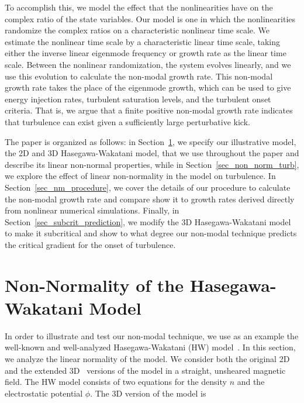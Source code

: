 \documentclass[twocolumn,showkeys,superscriptaddress]{revtex4}
\begin{document}
To accomplish this, we model the effect that the nonlinearities have on the complex ratio of the state variables. Our model is one in which the 
nonlinearities randomize the complex ratios on a characteristic nonlinear time scale.
We estimate the nonlinear time scale by a characteristic linear time scale, taking either the inverse linear eigenmode frequency or growth rate as the linear time scale.
Between the nonlinear randomization, the system evolves linearly, and we use this evolution to calculate the non-modal growth rate. This non-modal growth rate takes the place of the eigenmode growth, which can be used
to give energy injection rates, turbulent saturation levels, and the turbulent onset criteria.
That is, we argue that a finite positive non-modal growth rate
indicates that turbulence can exist given a sufficiently large perturbative kick.

The paper is organized as follows: in Section~\ref{sec_hw_model}, we specify our illustrative model, the 2D and 3D Hasegawa-Wakatani model,
that we use throughout the paper and describe its linear non-normal properties,  while in Section~\ref{sec_non_norm_turb}, we explore the effect of linear non-normality in the model on turbulence. 
In Section~\ref{sec_nm_procedure}, we cover the details of our procedure to calculate the non-modal growth rate and compare show it to growth rates derived directly from nonlinear numerical simulations. 
Finally, in Section~\ref{sec_subcrit_prediction}, we modify the 3D Hasegawa-Wakatani model to make it subcritical and show to what degree our non-modal technique predicts the critical gradient for the onset of turbulence.

\section{Non-Normality of the Hasegawa-Wakatani Model} 
\label{sec_hw_model}

In order to illustrate and test our non-modal technique, we use as an example the well-known and well-analyzed Hasegawa-Wakatani (HW) model~\cite{hasegawa1983}.
In this section, we analyze the linear normality of the model.
We consider both the original 2D and the extended 3D~\cite{biskamp1995} versions of the model in a straight, unsheared magnetic field. 
The HW model consists of two equations for the density $n$ and the electrostatic potential $\phi$. The 3D version of the model is
\end{document}
